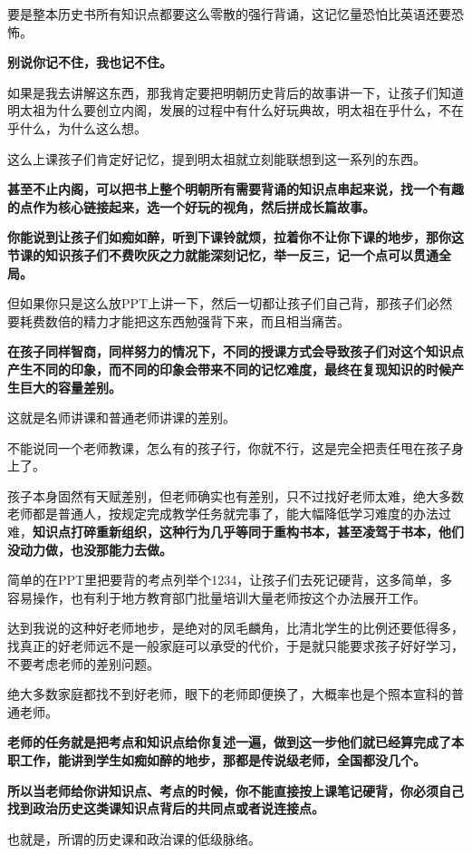 \documentclass[UTF8, 11pt, oneside]{ctexart}
\newcommand{\zd}[1]{\textbf{\textcolor[RGB]{123,12,0}{#1}}} %
\begin{document}
要是整本历史书所有知识点都要这么零散的强行背诵，这记忆量恐怕比英语还要恐怖。

\zd{别说你记不住，我也记不住。}

如果是我去讲解这东西，那我肯定要把明朝历史背后的故事讲一下，让孩子们知道明太祖为什么要创立内阁，发展的过程中有什么好玩典故，明太祖在乎什么，不在乎什么，为什么这么想。

这么上课孩子们肯定好记忆，提到明太祖就立刻能联想到这一系列的东西。

\zd{甚至不止内阁，可以把书上整个明朝所有需要背诵的知识点串起来说，找一个有趣的点作为核心链接起来，选一个好玩的视角，然后拼成长篇故事。}

\zd{你能说到让孩子们如痴如醉，听到下课铃就烦，拉着你不让你下课的地步，那你这节课的知识孩子们不费吹灰之力就能深刻记忆，举一反三，记一个点可以贯通全局。}

但如果你只是这么放PPT上讲一下，然后一切都让孩子们自己背，那孩子们必然要耗费数倍的精力才能把这东西勉强背下来，而且相当痛苦。

\zd{在孩子同样智商，同样努力的情况下，不同的授课方式会导致孩子们对这个知识点产生不同的印象，而不同的印象会带来不同的记忆难度，最终在复现知识的时候产生巨大的容量差别。}

这就是名师讲课和普通老师讲课的差别。

不能说同一个老师教课，怎么有的孩子行，你就不行，这是完全把责任甩在孩子身上了。

孩子本身固然有天赋差别，但老师确实也有差别，只不过找好老师太难，绝大多数老师都是普通人，按规定完成教学任务就完事了，能大幅降低学习难度的办法过难，\zd{知识点打碎重新组织，这种行为几乎等同于重构书本，甚至凌驾于书本，他们没动力做，也没那能力去做。}

简单的在PPT里把要背的考点列举个1234，让孩子们去死记硬背，这多简单，多容易操作，也有利于地方教育部门批量培训大量老师按这个办法展开工作。

达到我说的这种好老师地步，是绝对的凤毛麟角，比清北学生的比例还要低得多，找真正的好老师远不是一般家庭可以承受的代价，于是就只能要求孩子好好学习，不要考虑老师的差别问题。

绝大多数家庭都找不到好老师，眼下的老师即便换了，大概率也是个照本宣科的普通老师。

\zd{老师的任务就是把考点和知识点给你复述一遍，做到这一步他们就已经算完成了本职工作，能讲到学生如痴如醉的地步，那都是传说级老师，全国都没几个。}

\zd{所以当老师给你讲知识点、考点的时候，你不能直接按上课笔记硬背，你必须自己找到政治历史这类课知识点背后的共同点或者说连接点。}

也就是，所谓的历史课和政治课的低级脉络。
\end{document}
